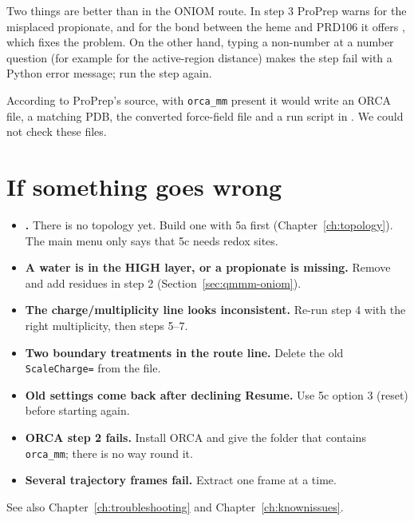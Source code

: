 Two things are better than in the ONIOM route. In step 3 ProPrep warns
 for the misplaced propionate, and for
the bond between the heme and PRD106 it offers
, which fixes the problem.
On the other hand, typing a non-number at a number question (for example
 for the active-region distance) makes the step fail with a Python
error message; run the step again.

According to ProPrep's source, with \texttt{orca\_mm} present it would write
an ORCA  file, a matching PDB, the converted 
force-field file and a run script in . We could not check
these files.

\section{If something goes wrong}
\label{sec:qmmm-problems}

\begin{itemize}\sloppy
  \item \textbf{.}
    There is no topology yet. Build one with 5a first
    (Chapter~\ref{ch:topology}). The main menu only says that 5c needs redox
    sites.
  \item \textbf{A water is in the HIGH layer, or a propionate is missing.}
    Remove and add residues in step 2 (Section~\ref{sec:qmmm-oniom}).
  \item \textbf{The charge/multiplicity line looks inconsistent.} Re-run step
    4 with the right multiplicity, then steps 5--7.
  \item \textbf{Two boundary treatments in the route line.} Delete the old
    \texttt{ScaleCharge=} from the  file.
  \item \textbf{Old settings come back after declining Resume.} Use 5c option
    3 (reset) before starting again.
  \item \textbf{ORCA step 2 fails.} Install ORCA and give the folder that
    contains \texttt{orca\_mm}; there is no way round it.
  \item \textbf{Several trajectory frames fail.} Extract one frame at a time.
\end{itemize}

See also Chapter~\ref{ch:troubleshooting} and Chapter~\ref{ch:knownissues}.
